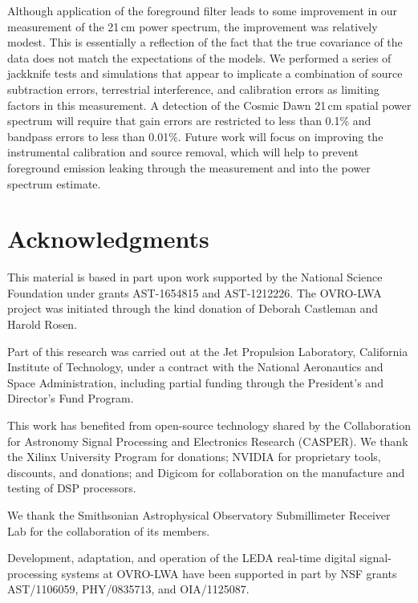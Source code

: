 \begin{bibunit}
Although application of the foreground filter leads to some improvement in our measurement of the
21\,cm power spectrum, the improvement was relatively modest. This is essentially a reflection of
the fact that the true covariance of the data does not match the expectations of the models. We
performed a series of jackknife tests and simulations that appear to implicate a combination of
source subtraction errors, terrestrial interference, and calibration errors as limiting factors in
this measurement. A detection of the Cosmic Dawn 21\,cm spatial power spectrum will require that
gain errors are restricted to less than 0.1\% and bandpass errors to less than 0.01\%.  Future work
will focus on improving the instrumental calibration and source removal, which will help to prevent
foreground emission leaking through the measurement and into the power spectrum estimate.

\section*{Acknowledgments}

This material is based in part upon work supported by the National Science Foundation under grants
AST-1654815 and AST-1212226. The OVRO-LWA project was initiated through the kind donation of Deborah
Castleman and Harold Rosen.

Part of this research was carried out at the Jet Propulsion Laboratory, California Institute of
Technology, under a contract with the National Aeronautics and Space Administration, including
partial funding through the President's and Director's Fund Program.

This work has benefited from open-source technology shared by the Collaboration for Astronomy Signal
Processing and Electronics Research (CASPER).  We thank the Xilinx University Program for donations;
NVIDIA for proprietary tools, discounts, and donations; and Digicom for collaboration on the
manufacture and testing of DSP processors.

We thank the Smithsonian Astrophysical Observatory Submillimeter Receiver Lab for the collaboration
of its members.

Development, adaptation, and operation of the LEDA real-time digital signal-processing systems at
OVRO-LWA have been supported in part by NSF grants AST/1106059, PHY/0835713, and OIA/1125087.

\begin{subappendices}


\end{subappendices}
\end{bibunit}
